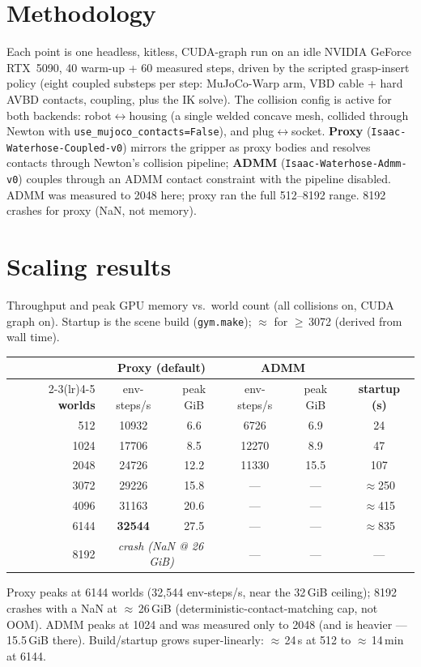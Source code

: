 \documentclass[a4paper,11pt]{article}
\newcommand{\tableheading}[1]{{\color{ReportMuted}#1\par\vspace{0.35em}}}
\newcommand{\ReportCaption}[1]{{\small\color{ReportMuted} #1\par}}
\newenvironment{reporttable}{%
  \vspace{0.35em}\begin{center}\small
  \renewcommand{\arraystretch}{1.3}\setlength{\tabcolsep}{10pt}%
}{%
  \end{center}\vspace{0.55em}%
}
\newcommand{\B}{\bfseries}
\begin{document}
\section{Methodology}

Each point is one headless, kitless, CUDA-graph run on an idle NVIDIA GeForce RTX~5090, 40 warm-up + 60
measured steps, driven by the scripted grasp-insert policy (eight coupled substeps per step: MuJoCo-Warp
arm, VBD cable + hard AVBD contacts, coupling, plus the IK solve). The collision config is active for
both backends: robot$\leftrightarrow$housing (a single welded concave mesh, collided through Newton with
\texttt{use\_mujoco\_contacts=False}), and plug$\leftrightarrow$socket. \textbf{Proxy}
(\texttt{Isaac-Waterhose-Coupled-v0})
mirrors the gripper as proxy bodies and resolves contacts through Newton's collision pipeline;
\textbf{ADMM} (\texttt{Isaac-Waterhose-Admm-v0}) couples through an ADMM contact constraint with the
pipeline disabled. ADMM was measured to 2048 here; proxy ran the full 512--8192 range. 8192 crashes for
proxy (NaN, not memory).

\section{Scaling results}

\tableheading{Throughput and peak GPU memory vs.\ world count (all collisions on, CUDA graph on).
Startup is the scene build (\texttt{gym.make}); $\approx$ for $\ge$\,3072 (derived from wall time).}
\begin{reporttable}
\setlength{\tabcolsep}{8pt}%
\begin{tabular}{@{}r cc cc c@{}}
\toprule
& \multicolumn{2}{c}{\textbf{Proxy (default)}} & \multicolumn{2}{c}{\textbf{ADMM}} & \\
\cmidrule(lr){2-3}\cmidrule(lr){4-5}
\textbf{worlds} & {env-steps/s} & {peak GiB} & {env-steps/s} & {peak GiB} & \textbf{startup (s)} \\
\midrule
512  & 10932  & 6.6  & 6726  & 6.9  & 24 \\
1024 & 17706  & 8.5  & 12270 & 8.9  & 47 \\
2048 & 24726  & 12.2 & 11330 & 15.5 & 107 \\
3072 & 29226  & 15.8 & ---   & ---  & $\approx$250 \\
4096 & 31163  & 20.6 & ---   & ---  & $\approx$415 \\
6144 & \B 32544 & 27.5 & ---  & ---  & $\approx$835 \\
8192 & \multicolumn{2}{c}{\emph{crash (NaN @ 26\,GiB)}} & --- & --- & --- \\
\bottomrule
\end{tabular}
\end{reporttable}
\ReportCaption{Proxy peaks at 6144 worlds (32{,}544 env-steps/s, near the 32\,GiB ceiling); 8192 crashes
with a NaN at $\approx$\,26\,GiB (deterministic-contact-matching cap, not OOM). ADMM peaks at 1024 and
was measured only to 2048 (and is heavier --- 15.5\,GiB there). Build/startup grows super-linearly:
$\approx$\,24\,s at 512 to $\approx$\,14\,min at 6144.}
\end{document}
